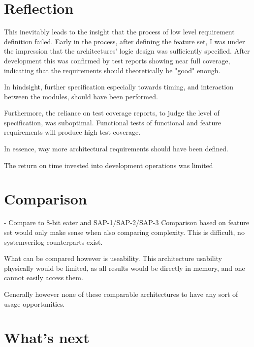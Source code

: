 \section{Reflection}
This inevitably leads to the insight that the process of low level requirement definition failed. Early in the process, after defining the feature set, I was under the impression that the architectures' logic design was sufficiently specified. After development this was confirmed by test reports showing near full coverage, indicating that the requirements should theoretically be "good" enough.

In hindsight, further specification especially towards timing, and interaction between the modules, should have been performed.

Furthermore, the reliance on test coverage reports, to judge the level of specification, was suboptimal. Functional tests of functional and feature requirements will produce high test coverage. 

In essence, way more architectural requirements should have been defined.

The return on time invested into development operations was limited 

\section{Comparison}

    - Compare to 8-bit eater and SAP-1/SAP-2/SAP-3
    Comparison based on feature set would only make sense when also comparing complexity. This is difficult, no systemverilog counterparts exist. 

    What can be compared however is useability. 
    This architecture usability physically would be limited, as all results would be directly in memory, and one cannot easily access them.

    Generally however none of these comparable architectures to have any sort of usage opportunities.


\section{What's next}

